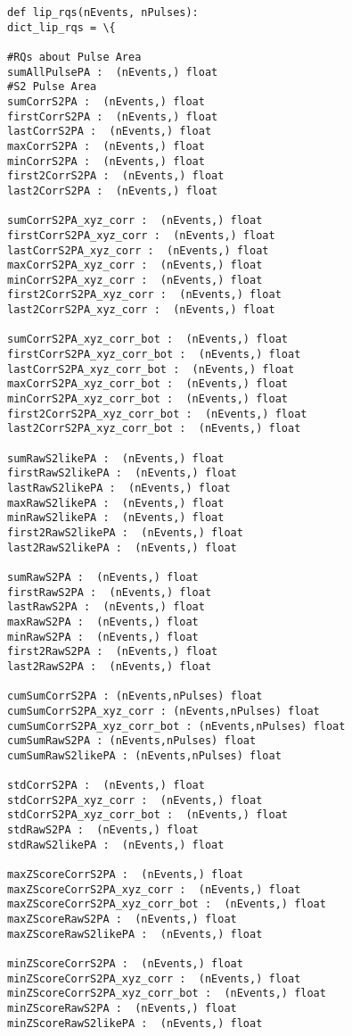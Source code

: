 \begin{Verbatim}[fontsize=\footnotesize]
def lip_rqs(nEvents, nPulses):
dict_lip_rqs = \{

#RQs about Pulse Area
sumAllPulsePA :  (nEvents,) float
#S2 Pulse Area
sumCorrS2PA :  (nEvents,) float 
firstCorrS2PA :  (nEvents,) float
lastCorrS2PA :  (nEvents,) float
maxCorrS2PA :  (nEvents,) float
minCorrS2PA :  (nEvents,) float
first2CorrS2PA :  (nEvents,) float
last2CorrS2PA :  (nEvents,) float

sumCorrS2PA_xyz_corr :  (nEvents,) float 
firstCorrS2PA_xyz_corr :  (nEvents,) float
lastCorrS2PA_xyz_corr :  (nEvents,) float
maxCorrS2PA_xyz_corr :  (nEvents,) float
minCorrS2PA_xyz_corr :  (nEvents,) float
first2CorrS2PA_xyz_corr :  (nEvents,) float
last2CorrS2PA_xyz_corr :  (nEvents,) float

sumCorrS2PA_xyz_corr_bot :  (nEvents,) float 
firstCorrS2PA_xyz_corr_bot :  (nEvents,) float
lastCorrS2PA_xyz_corr_bot :  (nEvents,) float
maxCorrS2PA_xyz_corr_bot :  (nEvents,) float
minCorrS2PA_xyz_corr_bot :  (nEvents,) float
first2CorrS2PA_xyz_corr_bot :  (nEvents,) float
last2CorrS2PA_xyz_corr_bot :  (nEvents,) float

sumRawS2likePA :  (nEvents,) float 
firstRawS2likePA :  (nEvents,) float
lastRawS2likePA :  (nEvents,) float
maxRawS2likePA :  (nEvents,) float
minRawS2likePA :  (nEvents,) float
first2RawS2likePA :  (nEvents,) float
last2RawS2likePA :  (nEvents,) float

sumRawS2PA :  (nEvents,) float 
firstRawS2PA :  (nEvents,) float
lastRawS2PA :  (nEvents,) float
maxRawS2PA :  (nEvents,) float
minRawS2PA :  (nEvents,) float
first2RawS2PA :  (nEvents,) float
last2RawS2PA :  (nEvents,) float

cumSumCorrS2PA : (nEvents,nPulses) float
cumSumCorrS2PA_xyz_corr : (nEvents,nPulses) float
cumSumCorrS2PA_xyz_corr_bot : (nEvents,nPulses) float
cumSumRawS2PA : (nEvents,nPulses) float
cumSumRawS2likePA : (nEvents,nPulses) float

stdCorrS2PA :  (nEvents,) float
stdCorrS2PA_xyz_corr :  (nEvents,) float
stdCorrS2PA_xyz_corr_bot :  (nEvents,) float
stdRawS2PA :  (nEvents,) float
stdRawS2likePA :  (nEvents,) float

maxZScoreCorrS2PA :  (nEvents,) float
maxZScoreCorrS2PA_xyz_corr :  (nEvents,) float
maxZScoreCorrS2PA_xyz_corr_bot :  (nEvents,) float
maxZScoreRawS2PA :  (nEvents,) float
maxZScoreRawS2likePA :  (nEvents,) float

minZScoreCorrS2PA :  (nEvents,) float
minZScoreCorrS2PA_xyz_corr :  (nEvents,) float
minZScoreCorrS2PA_xyz_corr_bot :  (nEvents,) float
minZScoreRawS2PA :  (nEvents,) float
minZScoreRawS2likePA :  (nEvents,) float


\end{Verbatim}

